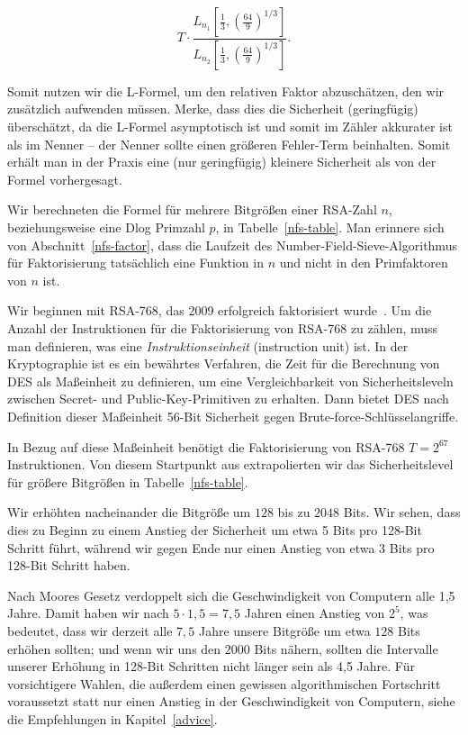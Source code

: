 \begin{refsegment}
$$
  T  \cdot \frac{ L_{n_1}[\frac 1
3,\left(\frac{64}{9}\right)^{1/3}] }
{ L_{n_2}[\frac 1
3,\left(\frac{64}{9}\right)^{1/3}] }.
$$

Somit nutzen wir die L-Formel, um den relativen Faktor abzuschätzen, den wir zusätzlich aufwenden müssen. Merke, dass dies die Sicherheit (geringfügig) überschätzt, da die L-Formel asymptotisch ist und somit im Zähler akkurater ist als im Nenner -- der Nenner sollte einen größeren Fehler-Term beinhalten. Somit erhält man in der Praxis eine (nur geringfügig) kleinere Sicherheit als von der Formel vorhergesagt.

Wir berechneten die Formel für mehrere Bitgrößen einer RSA-Zahl $n$, beziehungsweise eine Dlog Primzahl $p$, in Tabelle~\ref{nfs-table}. Man erinnere sich von Abschnitt~\ref{nfs-factor}, dass die Laufzeit des Number-Field-Sieve-Algorithmus für Faktorisierung tatsächlich eine Funktion in $n$ und nicht in den Primfaktoren von $n$ ist.


Wir beginnen mit RSA-768, das 2009 erfolgreich faktorisiert wurde~\cite{factor768_2010}. Um die Anzahl der Instruktionen für die Faktorisierung von RSA-768 zu zählen, muss man definieren, was eine {\em Instruktionseinheit} (instruction unit) ist. In der Kryptographie ist es ein bewährtes Verfahren, die Zeit für die Berechnung von DES als Maßeinheit zu definieren, um eine Vergleichbarkeit von Sicherheitsleveln zwischen Secret- und Public-Key-Primitiven zu erhalten. Dann bietet DES nach Definition dieser Maßeinheit 56-Bit Sicherheit gegen Brute-force-Schlüsselangriffe.

In Bezug auf diese Maßeinheit benötigt die Faktorisierung von RSA-768 $T=2^{67}$ Instruktionen. Von diesem Startpunkt aus extrapolierten wir das Sicherheitslevel für größere Bitgrößen in Tabelle~\ref{nfs-table}.

Wir erhöhten nacheinander die Bitgröße um $128$ bis zu $2048$ Bits. Wir sehen, dass dies zu Beginn zu einem Anstieg der Sicherheit um etwa 5 Bits pro 128-Bit Schritt führt, während wir gegen Ende nur einen Anstieg von etwa 3 Bits pro 128-Bit Schritt haben.

Nach Moores Gesetz verdoppelt sich die Geschwindigkeit von Computern alle 1,5 Jahre. Damit haben wir nach $5\cdot 1,5 = 7,5$ Jahren einen Anstieg von $2^5$, was bedeutet, dass wir derzeit alle $7,5$ Jahre unsere Bitgröße um etwa $128$ Bits erhöhen sollten; und wenn wir uns den $2000$ Bits nähern, sollten die Intervalle unserer Erhöhung in 128-Bit Schritten nicht länger sein als 4,5 Jahre. Für vorsichtigere Wahlen, die außerdem einen gewissen algorithmischen Fortschritt voraussetzt statt nur einen Anstieg in der Geschwindigkeit von Computern, siehe die Empfehlungen in Kapitel~\ref{advice}.


\end{refsegment}
